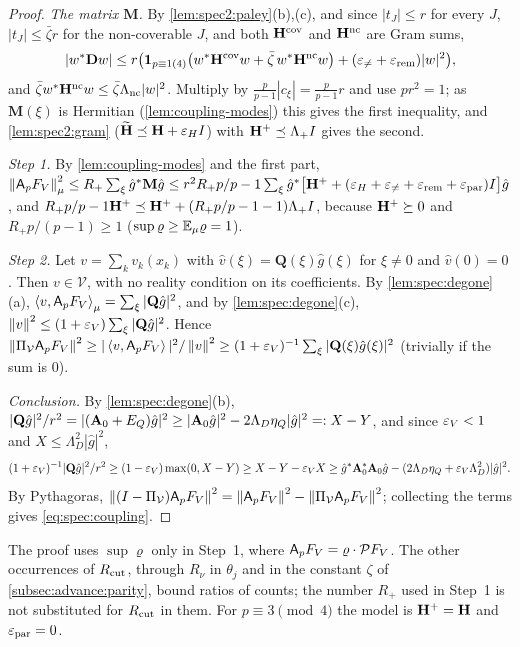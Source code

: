 \begin{proof}
\emph{The matrix $\mathbf M$.} By \cref{lem:spec2:paley}(b),(c), and since $|t_J|\le r$
for every $J$, $|t_J|\le\bar\zeta r$ for the non-coverable $J$, and both
$\mathbf H^{\rm cov}$ and $\mathbf H^{\rm nc}$ are Gram sums,
\[
  |w^*\mathbf Dw|\le r\big(\mathbf 1_{p\equiv1(4)}\big(w^*\mathbf H^{\rm cov}w+\bar\zeta\,w^*\mathbf H^{\rm nc}w\big)
  +(\varepsilon_{\ne}+\varepsilon_{\rm rem})|w|^2\big),
\]
and $\bar\zeta w^*\mathbf H^{\rm nc}w\le\bar\zeta\Lambda_{\rm nc}|w|^2$. Multiply by
$\frac p{p-1}|c_\xi|=\frac p{p-1}r$ and use $pr^2=1$; as $\mathbf M(\xi)$ is Hermitian
(\cref{lem:coupling-modes}) this gives the first inequality, and
\cref{lem:spec2:gram} ($\widetilde{\mathbf H}\preceq\mathbf H+\varepsilon_HI$) with $\mathbf H^+\preceq\Lambda_+I$ gives
the second.

\emph{Step 1.} By \cref{lem:coupling-modes} and the first part,
$\left\|\mathsf A_p F_V\right\|^2_\mu\le R_+\sum_\xi\hat g^*\mathbf M\hat g\le
r^2R_+p/p-1\sum_\xi\hat g^*\big[\mathbf H^++(\varepsilon_H+\varepsilon_{\ne}+\varepsilon_{\rm rem}+\varepsilon_{\rm par})I\big]\hat g$,
and $R_+p/p-1\mathbf H^+\preceq\mathbf H^++(R_+p/p-1-1)\Lambda_+I$, because
$\mathbf H^+\succeq0$ and $R_+p/(p-1)\ge1$ ($\sup\varrho\ge\mathbb E_\mu\varrho=1$).

\emph{Step 2.} Let $v=\sum_kv_k(x_k)$ with $\hat v(\xi)=\mathbf Q(\xi)\hat g(\xi)$ for
$\xi\ne0$ and $\hat v(0)=0$. Then $v\in\mathcal V$, with no reality
condition on its coefficients. By \cref{lem:spec:degone}(a),
$\left\langle v,\mathsf A_p F_V\right\rangle_\mu=\sum_\xi|\mathbf Q\hat g|^2$, and by \cref{lem:spec:degone}(c),
$\left\|v\right\|^2\le(1+\varepsilon_V)\sum_\xi|\mathbf Q\hat g|^2$. Hence
$\left\|\Pi_{\mathcal V}\mathsf A_p F_V\right\|^2\ge|\left\langle v,\mathsf A_p F_V\right\rangle|^2/\left\|v\right\|^2\ge(1+\varepsilon_V)^{-1}
\sum_\xi|\mathbf Q(\xi)\hat g(\xi)|^2$ (trivially if the sum is $0$).

\emph{Conclusion.} By \cref{lem:spec:degone}(b),
$|\mathbf Q\hat g|^2/r^2=|(\mathbf A_{0}+E_Q)\hat g|^2\ge|\mathbf A_{0}\hat g|^2-2\Lambda_D\eta_Q|\hat g|^2=:X-Y$,
and since $\varepsilon_V<1$ and $X\le\Lambda_D^2|\hat g|^2$,
\[
  (1+\varepsilon_V)^{-1}|\mathbf Q\hat g|^2/r^2\ge(1-\varepsilon_V)\max(0,X-Y)\ge X-Y-\varepsilon_VX
  \ge\hat g^*\mathbf A_{0}^*\mathbf A_{0}\hat g-(2\Lambda_D\eta_Q+\varepsilon_V\Lambda_D^2)|\hat g|^2 .
\]
By Pythagoras, $\left\|(I-\Pi_{\mathcal V})\mathsf A_p F_V\right\|^2=\left\|\mathsf A_p F_V\right\|^2-\left\|\Pi_{\mathcal V}\mathsf A_p F_V\right\|^2$;
collecting the terms gives \eqref{eq:spec:coupling}.
\end{proof}

The proof uses $\sup\varrho$ only in Step~1, where $\mathsf A_p F_V=\varrho\cdot\mathcal PF_V$. The
other occurrences of $R_{\mathrm{cut}}$, through $R_\nu$ in $\theta_j$ and in the constant
$\zeta$ of \cref{subsec:advance:parity}, bound ratios of counts; the number $R_+$ used in Step~1 is not substituted for $R_{\mathrm{cut}}$ in them. For $p\equiv3\pmod4$ the model is $\mathbf H^+=\mathbf H$ and
$\varepsilon_{\rm par}=0$.

